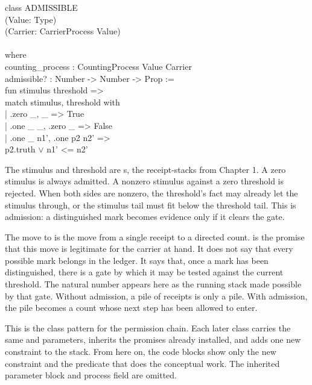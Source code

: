 \begin{leancode}
class ADMISSIBLE\\
\quad (Value: Type)\\
\quad (Carrier: CarrierProcess Value)\\
\\
\quad where\\
\quad counting\_process : CountingProcess Value Carrier\\
\quad admissible? : Number -> Number -> Prop :=\\
\quad\quad fun stimulus threshold =>\\
\quad\quad match stimulus, threshold with\\
\quad\quad | .zero \_, \_ => True\\
\quad\quad | .one \_ \_, .zero \_ => False\\
\quad\quad | .one \_ n1', .one p2 n2' =>\\
\quad\quad\quad p2.truth \(\vee\) n1' <= n2'
\end{leancode}

The stimulus and threshold are s, the receipt-stacks from Chapter
1. A zero stimulus is always admitted. A nonzero stimulus against a zero
threshold is rejected. When both sides are nonzero, the threshold's fact may
already let the stimulus through, or the stimulus tail must fit below the
threshold tail. This is admission: a distinguished mark becomes evidence only
if it clears the gate.

The move to  is the move from a single receipt to a directed
count.  is the promise that this move is legitimate for the
carrier at hand. It does not say that every possible mark belongs in the
ledger. It says that, once a mark has been distinguished, there is a gate by
which it may be tested against the current threshold. The natural number
appears here as the running stack made possible by that gate. Without
admission, a pile of receipts is only a pile. With admission, the pile becomes
a count whose next step has been allowed to enter.

This is the class pattern for the permission chain. Each later class carries
the same  and  parameters, inherits the promises
already installed, and adds one new constraint to the stack. From here on, the
code blocks show only the new constraint and the predicate that does the
conceptual work. The inherited parameter block and process field are omitted.

